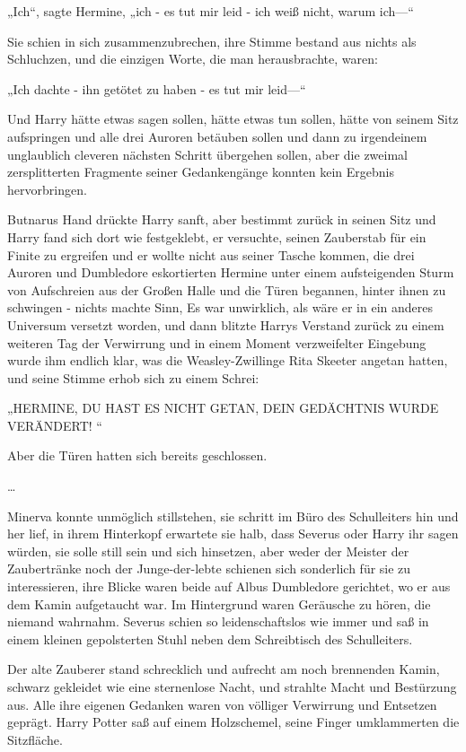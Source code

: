 {„Ich“, sagte Hermine, „ich - es tut mir leid - ich weiß nicht, warum ich—“

Sie schien in sich zusammenzubrechen, ihre Stimme bestand aus nichts als Schluchzen, und die einzigen Worte, die man herausbrachte, waren:

„Ich dachte - ihn getötet zu haben - es tut mir leid—“

Und Harry hätte etwas sagen sollen, hätte etwas tun sollen, hätte von seinem Sitz aufspringen und alle drei Auroren betäuben sollen und dann zu irgendeinem unglaublich cleveren nächsten Schritt übergehen sollen, aber die zweimal zersplitterten Fragmente seiner Gedankengänge konnten kein Ergebnis hervorbringen.

Butnarus Hand drückte Harry sanft, aber bestimmt zurück in seinen Sitz und Harry fand sich dort wie festgeklebt, er versuchte, seinen Zauberstab für ein Finite zu ergreifen und er wollte nicht aus seiner Tasche kommen, die drei Auroren und Dumbledore eskortierten Hermine unter einem aufsteigenden Sturm von Aufschreien aus der Großen Halle und die Türen begannen, hinter ihnen zu schwingen - nichts machte Sinn, Es war unwirklich, als wäre er in ein anderes Universum versetzt worden, und dann blitzte Harrys Verstand zurück zu einem weiteren Tag der Verwirrung und in einem Moment verzweifelter Eingebung wurde ihm endlich klar, was die Weasley-Zwillinge Rita Skeeter angetan hatten, und seine Stimme erhob sich zu einem Schrei:

„HERMINE, DU HAST ES NICHT GETAN, DEIN GEDÄCHTNIS WURDE VERÄNDERT! “

Aber die Türen hatten sich bereits geschlossen.

…

Minerva konnte unmöglich stillstehen, sie schritt im Büro des Schulleiters hin und her lief, in ihrem Hinterkopf erwartete sie halb, dass Severus oder Harry ihr sagen würden, sie solle still sein und sich hinsetzen, aber weder der Meister der Zaubertränke noch der Junge-der-lebte schienen sich sonderlich für sie zu interessieren, ihre Blicke waren beide auf Albus Dumbledore gerichtet, wo er aus dem Kamin aufgetaucht war. Im Hintergrund waren Geräusche zu hören, die niemand wahrnahm. Severus schien so leidenschaftslos wie immer und saß in einem kleinen gepolsterten Stuhl neben dem Schreibtisch des Schulleiters.

Der alte Zauberer stand schrecklich und aufrecht am noch brennenden Kamin, schwarz gekleidet wie eine sternenlose Nacht, und strahlte Macht und Bestürzung aus. Alle ihre eigenen Gedanken waren von völliger Verwirrung und Entsetzen geprägt. Harry Potter saß auf einem Holzschemel, seine Finger umklammerten die Sitzfläche.

}
